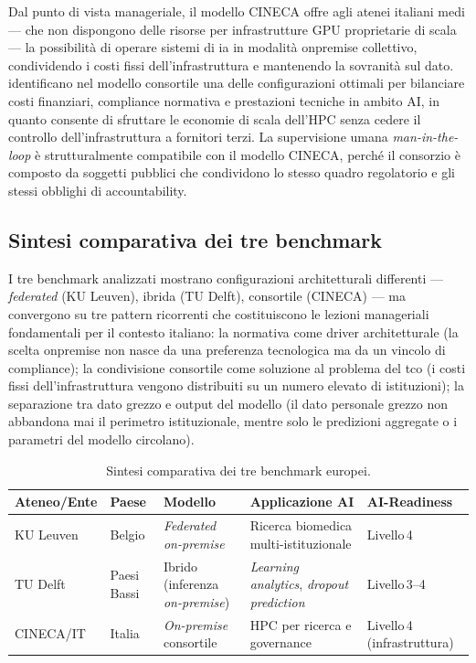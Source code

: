 Dal punto di vista manageriale, il modello CINECA offre agli atenei italiani medi ---
che non dispongono delle risorse per infrastrutture GPU proprietarie di scala --- la
possibilità di operare sistemi di \gls{ia} in modalità \gls{onpremise} collettivo,
condividendo i costi fissi dell'infrastruttura e mantenendo la sovranità sul dato.
\textcite{Madhavan2025Storage} identificano nel modello consortile una delle
configurazioni ottimali per bilanciare costi finanziari, compliance normativa e
prestazioni tecniche in ambito AI, in quanto consente di sfruttare le economie di scala
dell'HPC senza cedere il controllo dell'infrastruttura a fornitori terzi. La supervisione
umana \textit{man-in-the-loop} è strutturalmente compatibile con il modello CINECA,
perché il consorzio è composto da soggetti pubblici che condividono lo stesso quadro
regolatorio e gli stessi obblighi di accountability.

\subsection{Sintesi comparativa dei tre benchmark}

I tre benchmark analizzati mostrano configurazioni architetturali differenti ---
\textit{federated} (KU Leuven), ibrida (TU Delft), consortile (CINECA) --- ma convergono
su tre pattern ricorrenti che costituiscono le lezioni manageriali fondamentali per il
contesto italiano: la normativa come driver architetturale (la scelta
\gls{onpremise} non nasce da una preferenza tecnologica ma da un vincolo di
compliance); la condivisione consortile come soluzione al problema del \gls{tco}
(i costi fissi dell'infrastruttura vengono distribuiti su un numero elevato di
istituzioni); la separazione tra dato grezzo e output del modello (il dato
personale grezzo non abbandona mai il perimetro istituzionale, mentre solo le predizioni
aggregate o i parametri del modello circolano).

\begin{table}[H]
\centering
\caption{Sintesi comparativa dei tre benchmark europei.}
\label{tab:casi-europei}
\begin{tabularx}{\textwidth}{l X X X X}
\toprule
\textbf{Ateneo/Ente} & \textbf{Paese} & \textbf{Modello} & \textbf{Applicazione AI} &
\textbf{AI-Readiness} \\
\midrule
KU Leuven & Belgio & \textit{Federated on-premise} & Ricerca biomedica
multi-istituzionale & Livello\,4 \\
TU Delft & Paesi Bassi & Ibrido (inferenza \textit{on-premise}) & \textit{Learning
analytics}, \textit{dropout prediction} & Livello\,3--4 \\
CINECA/IT & Italia & \textit{On-premise} consortile & HPC per ricerca e governance &
Livello\,4 (infrastruttura) \\
\bottomrule
\end{tabularx}
\end{table}

